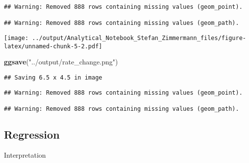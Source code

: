 \documentclass[]{article}
\newenvironment{Shaded}{\begin{snugshade}}{\end{snugshade}}
\newcommand{\DataTypeTok}[1]{\textcolor[rgb]{0.13,0.29,0.53}{#1}}
\newcommand{\DecValTok}[1]{\textcolor[rgb]{0.00,0.00,0.81}{#1}}
\newcommand{\FloatTok}[1]{\textcolor[rgb]{0.00,0.00,0.81}{#1}}
\newcommand{\KeywordTok}[1]{\textcolor[rgb]{0.13,0.29,0.53}{\textbf{#1}}}
\newcommand{\NormalTok}[1]{#1}
\newcommand{\OperatorTok}[1]{\textcolor[rgb]{0.81,0.36,0.00}{\textbf{#1}}}
\newcommand{\StringTok}[1]{\textcolor[rgb]{0.31,0.60,0.02}{#1}}
\begin{document}
\begin{verbatim}
## Warning: Removed 888 rows containing missing values (geom_point).

## Warning: Removed 888 rows containing missing values (geom_path).
\end{verbatim}

\texttt{[image: ../output/Analytical\_Notebook\_Stefan\_Zimmermann\_files/figure-latex/unnamed-chunk-5-2.pdf]}

\begin{Shaded}
\begin{Highlighting}[]
\KeywordTok{ggsave}\NormalTok{(}\StringTok{"../output/rate_change.png"}\NormalTok{)}
\end{Highlighting}
\end{Shaded}

\begin{verbatim}
## Saving 6.5 x 4.5 in image
\end{verbatim}

\begin{verbatim}
## Warning: Removed 888 rows containing missing values (geom_point).

## Warning: Removed 888 rows containing missing values (geom_path).
\end{verbatim}

\hypertarget{regression}{%
\subsection{Regression}\label{regression}}

Interpretation

\begin{Shaded}
\end{Shaded}
\end{document}
